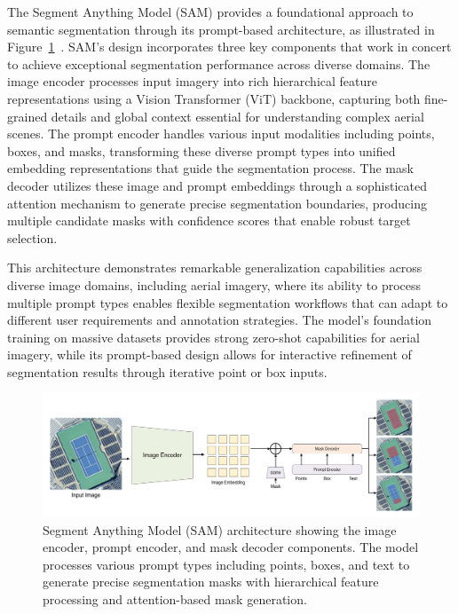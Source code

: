 The Segment Anything Model (SAM) provides a foundational approach to semantic segmentation through its prompt-based architecture, as illustrated in Figure~\ref{fig:sam_architecture}~\cite{sam}. SAM's design incorporates three key components that work in concert to achieve exceptional segmentation performance across diverse domains. The image encoder processes input imagery into rich hierarchical feature representations using a Vision Transformer (ViT) backbone, capturing both fine-grained details and global context essential for understanding complex aerial scenes. The prompt encoder handles various input modalities including points, boxes, and masks, transforming these diverse prompt types into unified embedding representations that guide the segmentation process. The mask decoder utilizes these image and prompt embeddings through a sophisticated attention mechanism to generate precise segmentation boundaries, producing multiple candidate masks with confidence scores that enable robust target selection.

This architecture demonstrates remarkable generalization capabilities across diverse image domains, including aerial imagery, where its ability to process multiple prompt types enables flexible segmentation workflows that can adapt to different user requirements and annotation strategies. The model's foundation training on massive datasets provides strong zero-shot capabilities for aerial imagery, while its prompt-based design allows for interactive refinement of segmentation results through iterative point or box inputs.

\begin{figure}[htbp]
\centering
\includegraphics[width=1.0\textwidth]{Images/sam.png}
\caption{Segment Anything Model (SAM) architecture showing the image encoder, prompt encoder, and mask decoder components. The model processes various prompt types including points, boxes, and text to generate precise segmentation masks with hierarchical feature processing and attention-based mask generation.}
\label{fig:sam_architecture}
\end{figure}

